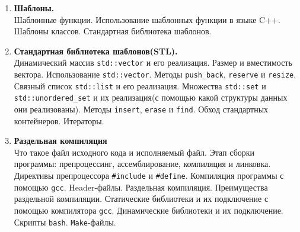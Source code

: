 \documentclass{article}
\begin{document}
\begin{enumerate}
\item \textbf{Шаблоны.}\\
Шаблонные функции. Использование шаблонных функции в языке C++. Шаблоны классов. Стандартная библиотека шаблонов.

\item \textbf{Стандартная библиотека шаблонов(STL).}\\
Динамический массив \texttt{std::vector} и его реализация. Размер и вместимость вектора. Использование \texttt{std::vector}. Методы \texttt{push\_back}, \texttt{reserve} и \texttt{resize}. Связный список \texttt{std::list} и его реализация. Множества \texttt{std::set} и \texttt{std::unordered\_set} и их реализация(с помощью какой структуры данных они реализованы). Методы \texttt{insert}, \texttt{erase} и \texttt{find}. Обход стандартных контейнеров. Итераторы.\\
 
\item \textbf{Раздельная компиляция}\\
Что такое файл исходного кода и исполняемый файл. Этап сборки программы: препроцессинг, ассемблирование, компиляция и линковка. Директивы препроцессора \texttt{\#include} и \texttt{\#define}. Компиляция программы с помощью \texttt{gcc}. Header-файлы. Раздельная компиляция. Преимущества раздельной компиляции. Статические библиотеки и их подключение с помощью компилятора \texttt{gcc}. Динамические библиотеки и их подключение. Скрипты \texttt{bash}. \texttt{Make}-файлы.

\end{enumerate}
\end{document}
